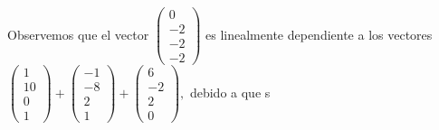 \documentclass[11pt,letterpaper]{article}
\begin{document}
\begin{enumerate}
Observemos que el vector $\begin{pmatrix}
0\\
-2\\
-2\\
-2
\end{pmatrix}$ es linealmente dependiente a los vectores $\begin{pmatrix}
1\\
10\\
0\\
1
\end{pmatrix}+\begin{pmatrix}
-1\\
-8\\
2\\
1
\end{pmatrix}+\begin{pmatrix}
6\\
-2\\
2\\
0
\end{pmatrix},$ debido a que s


\end{enumerate}
\end{document}
